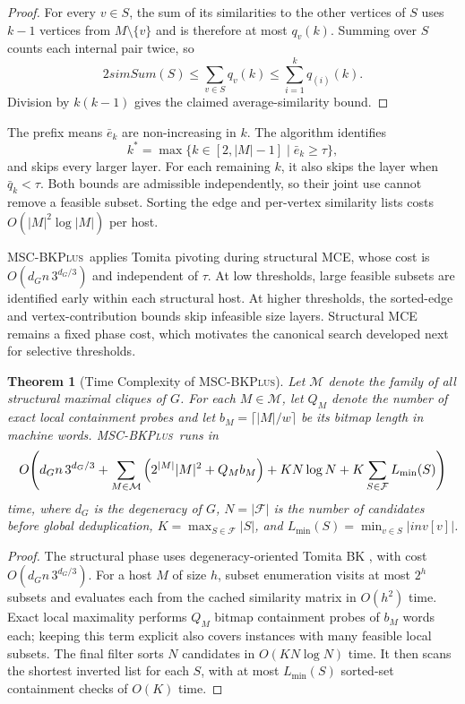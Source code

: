 \documentclass[sigconf, nonacm]{acmart}
\newtheorem{theorem}{Theorem}[section]
\newcommand{\stitle}[1]{\vspace{0.7ex} \noindent{\bf #1}}
\newcommand{\subEnum}{MSC-\textsc{BKPlus}}
\newcommand{\simsum}{\mathit{simSum}}
\begin{document}
\begin{proof}
For every $v\in S$, the sum of its similarities to the other vertices of
$S$ uses $k-1$ vertices from $M\setminus\{v\}$ and is therefore at most
$q_v(k)$. Summing
over $S$ counts each internal pair twice, so
\[
  2\simsum(S)
  \leq \sum_{v\in S}q_v(k)
  \leq \sum_{i=1}^{k}q_{(i)}(k).
\]
Division by $k(k-1)$ gives the claimed average-similarity bound.
\end{proof}

The prefix means $\bar e_k$ are non-increasing in $k$. The algorithm identifies
\[
  k^* = \max\!\bigl\{k \in [2, |M|-1] \;\big|\; \bar{e}_k \geq \tau\bigr\},
\]
and skips every larger layer. For each remaining $k$, it also skips the layer
when $\bar q_k<\tau$. Both bounds are admissible independently, so their joint
use cannot remove a feasible subset. Sorting the edge and per-vertex
similarity lists costs $O(|M|^2\log |M|)$ per host.

\stitle{Applicable Regime.}
\subEnum\ applies Tomita pivoting during structural MCE, whose cost is
$O(d_Gn\,3^{d_G/3})$ and independent of $\tau$.  At low thresholds, large
feasible subsets are identified early within each structural host.  At higher
  thresholds, the sorted-edge and vertex-contribution bounds skip infeasible size
layers.  Structural MCE remains a fixed phase cost, which motivates the
canonical search developed next for selective thresholds.

\stitle{Complexity.}
\begin{theorem}[Time Complexity of \subEnum]
  \label{the:alg2complexity}
  Let $\mathcal M$ denote the family of all structural maximal cliques of $G$.
  For each $M\in\mathcal M$, let $Q_M$ denote the number of exact local
  containment probes and let $b_M=\lceil |M|/w\rceil$ be its bitmap
  length in machine words.  \subEnum\ runs in
  \[
    \resizebox{0.99\columnwidth}{!}{$\displaystyle
      O\!\left(d_Gn\,3^{d_G/3}+\sum_{M\in\mathcal M}
      \left(2^{|M|}|M|^2+Q_Mb_M\right)
      +KN\log N+K\sum_{S\in\mathcal F}L_{\min}(S)\right)$}
  \]
  time, where $d_G$ is the degeneracy of $G$, $N=|\mathcal F|$ is the number
  of candidates before global deduplication,
  $K=\max_{S\in\mathcal F}|S|$, and
  $L_{\min}(S)=\min_{v\in S}|\mathit{inv}[v]|$.
\end{theorem}
\begin{proof}
  The structural phase uses degeneracy-oriented Tomita BK
  \cite{eppstein2013}, with cost $O(d_Gn\,3^{d_G/3})$. For a host $M$ of size $h$,
  subset enumeration visits at most $2^h$ subsets and evaluates each from the
  cached similarity matrix in $O(h^2)$ time.  Exact local maximality performs
  $Q_M$ bitmap containment probes of $b_M$ words each; keeping this term
  explicit also covers instances with many feasible local subsets.  The final
  filter sorts $N$ candidates in $O(KN\log N)$ time.  It then scans the shortest
  inverted list for each $S$, with at most $L_{\min}(S)$ sorted-set containment
  checks of $O(K)$ time.
\end{proof}
\end{document}
